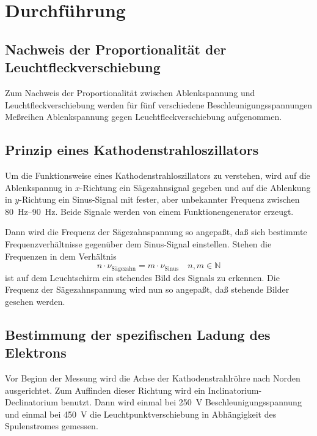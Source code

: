 
\section{Durchführung}
\label{sec:durchfuehrung}

\subsection{Nachweis der Proportionalität der Leuchtfleckverschiebung}

Zum Nachweis der Proportionalität zwischen Ablenkspannung und
Leuchtfleckverschiebung werden für fünf verschiedene
Beschleunigungsspannungen Meßreihen Ablenkspannung gegen
Leuchtfleckverschiebung aufgenommen.

\subsection{Prinzip eines Kathodenstrahloszillators}

Um die Funktionsweise eines Kathodenstrahloszillators zu verstehen, wird
auf die Ablenkspannug in $x$-Richtung ein Sägezahnsignal gegeben und auf
die Ablenkung in $y$-Richtung ein Sinus-Signal mit fester, aber
unbekannter Frequenz zwischen \SIrange{80}{90}{\hertz}. Beide Signale
werden von einem Funktionengenerator erzeugt.

Dann wird die Frequenz der Sägezahnspannung so angepaßt, daß sich
bestimmte Frequenzverhältnisse gegenüber dem Sinus-Signal
einstellen. Stehen die Frequenzen in dem Verhältnis
%
\begin{equation}
  \label{eq:synchro-constraint}
  n \cdot \nu_\text{Sägezahn} = m \cdot \nu_\text{Sinus} \quad n, m\in\mathbb{N}
\end{equation}
%
ist auf dem Leuchtschirm ein stehendes Bild des Signals zu erkennen. Die
Frequenz der Sägezahnspannung wird nun so angepaßt, daß stehende Bilder
gesehen werden.

\subsection{Bestimmung der spezifischen Ladung des Elektrons}

Vor Beginn der Messung wird die Achse der Kathodenstrahlröhre nach
Norden ausgerichtet. Zum Auffinden dieser Richtung wird ein
Inclinatorium-Declinatorium benutzt. Dann wird einmal bei
\SI{250}{\volt} Beschleunigungsspannung und einmal bei \SI{450}{\volt}
die Leuchtpunktverschiebung in Abhängigkeit des Spulenstromes gemessen.

